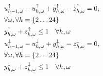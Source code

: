 {\begin{subequations}
\begin{align}
        \quad                                                                                             & \quad u_{h-1,\omega}^{\uparrow} - u_{h,\omega}^{\uparrow} + y_{h,\omega}^{\uparrow} - z_{h,\omega}^{\uparrow} = 0, \notag                                                                                                                                                                                                                                                         \\ \quad & \quad           \forall{\omega}, \forall{h} = \{2 \ldots 24 \}                                                                                                                                        \label{aux:1}                                       \\
        \quad                                                                                             & \quad y_{h,\omega}^{\uparrow} + z_{h,\omega}^{\uparrow} \leq 1 \quad                                                             \forall{h,\omega}                                                                                                                                                                     \label{aux:2}                                              \\
        \quad                                                                                             & \quad u_{h-1,\omega}^{\downarrow} - u_{h,\omega}^{\downarrow} + y_{h,\omega}^{\downarrow} - z_{h,\omega}^{\downarrow} = 0, \notag                                                                                                                                                                                                                                                 \\ \quad & \quad   \forall{\omega}, \forall{h} = \{2 \ldots 24 \}                                                                                                                                        \label{aux:3}                                       \\
        \quad                                                                                             & \quad y_{h,\omega}^{\downarrow} + z_{h,\omega}^{\downarrow} \leq 1 \quad                                                         \forall{h,\omega}                                                                                                                                                                     \label{aux:4}                                              \\

\end{align}
\end{subequations}}
